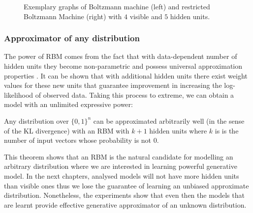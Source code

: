 \documentclass[../report/report.tex]{subfiles}
\begin{document}
\begin{figure}[!h]
\begin{center}
\end{center}
\endminipage\hfill
  \caption[1]{Exemplary graphs of Boltzmann machine (left) and restricted Boltzmann Machine (right) with $4$ visible and $5$ hidden units.}
  \label{fig:bm}
\end{figure}

\subsubsection{Approximator of any distribution}
The power of RBM comes from the fact that with data-dependent number of hidden units they become non-parametric and possess universal approximation properties \cite{le2008representational}.
It can be shown that with additional hidden units there exist weight values for these new units that guarantee improvement in increasing the log-likelihood of observed data. Taking this process to extreme, we can obtain a model with an unlimited expressive power:
\begin{theorem}  Any distribution over $\{0,1 \}^n$ can be approximated arbitrarily well (in the sense of the KL divergence) with an RBM with $k+1$ hidden units where	$k$ is is the number of input vectors whose probability is not $0$.
\end{theorem}
This theorem shows that an RBM is the natural candidate for modelling an arbitrary distribution where we are interested in learning powerful generative model. In the next chapters, analysed models will not have more hidden units than visible ones thus we lose the guarantee of learning an unbiased approximate distribution. Nonetheless, the experiments show that even then the models that are learnt provide effective generative approximator of an unknown distribution.
\end{document}
